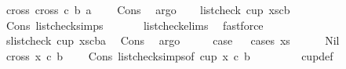 \begin{isabellebody}
\ cross{}{\isacharcolon}{\kern0pt}\ {\isachardoublequoteopen}cross{}\ c\ b\ a\ {\isachargreater}{\kern0pt}\ {}{\isachardoublequoteclose}\ \isamarkupfalse%
\ Cons\ \isamarkupfalse%
\ argo\isanewline
\ \ \isamarkupfalse%
\ {\isachardoublequoteopen}list{\isacharunderscore}{\kern0pt}check\ cup{}\ {\isacharparenleft}{\kern0pt}xs{\isacharat}{\kern0pt}{\isacharbrackleft}{\kern0pt}c{\isacharcomma}{\kern0pt}b{\isacharbrackright}{\kern0pt}{\isacharparenright}{\kern0pt}{\isachardoublequoteclose}\ \isamarkupfalse%
\ Cons{\isacharparenleft}{\kern0pt}{}{\isacharparenright}{\kern0pt}\ list{\isacharunderscore}{\kern0pt}check{\isachardot}{\kern0pt}simps\ \isanewline
\ \ \ \ \isamarkupfalse%
\ list{\isacharunderscore}{\kern0pt}check{\isachardot}{\kern0pt}elims{\isacharparenleft}{\kern0pt}{}{\isacharparenright}{\kern0pt}\ \isamarkupfalse%
\ fastforce\ \isanewline
\ \ \isamarkupfalse%
\ s{}{\isacharcolon}{\kern0pt}{\isachardoublequoteopen}list{\isacharunderscore}{\kern0pt}check\ cup{}\ {\isacharparenleft}{\kern0pt}xs{\isacharat}{\kern0pt}{\isacharbrackleft}{\kern0pt}c{\isacharcomma}{\kern0pt}b{\isacharcomma}{\kern0pt}a{\isacharbrackright}{\kern0pt}{\isacharparenright}{\kern0pt}{\isachardoublequoteclose}\ \isamarkupfalse%
\ Cons\ \isamarkupfalse%
\ argo\isanewline
\ \ \isamarkupfalse%
\ \isamarkupfalse%
\ {\isacharquery}{\kern0pt}case\isanewline
\ \ \isamarkupfalse%
{\isacharparenleft}{\kern0pt}cases\ xs{\isacharparenright}{\kern0pt}\isanewline
\ \ \ \ \isamarkupfalse%
\ Nil\isanewline
\ \ \ \ \isamarkupfalse%
\ {\isachardoublequoteopen}cross{}\ x\ c\ b\ {\isachargreater}{\kern0pt}\ {}{\isachardoublequoteclose}\ \isamarkupfalse%
\ Cons{\isacharparenleft}{\kern0pt}{}{\isacharparenright}{\kern0pt}\ list{\isacharunderscore}{\kern0pt}check{\isachardot}{\kern0pt}simps{\isacharparenleft}{\kern0pt}{}{\isacharparenright}{\kern0pt}{\isacharbrackleft}{\kern0pt}of\ cup{}\ x\ c\ b\ {\isachardoublequoteopen}{\isacharbrackleft}{\kern0pt}{\isacharbrackright}{\kern0pt}{\isachardoublequoteclose}{\isacharbrackright}{\kern0pt}\isanewline
\ \ \ \ \ \ \isamarkupfalse%
\ cup{}{\isacharunderscore}{\kern0pt}def\ \isanewline

\end{isabellebody}

